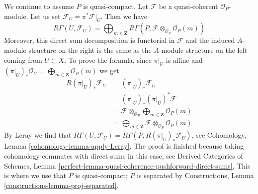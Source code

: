 \medskip\noindent
We continue to assume $P$ is quasi-compact.
Let $\mathcal{F}$ be a quasi-coherent $\mathcal{O}_P$-module.
Let us set $\mathcal{F}_U = \pi^*\mathcal{F}|_U$. Then we have
\begin{equation}
\label{equation-cohomology-torsor}
R\Gamma(U, \mathcal{F}_U) =
\bigoplus\nolimits_{m \in \mathbf{Z}}
R\Gamma(P, \mathcal{F} \otimes_{\mathcal{O}_P} \mathcal{O}_P(m))
\end{equation}
Moreover, this direct sum decomposition is functorial in $\mathcal{F}$
and the induced $A$-module structure on the right is the same as the
$A$-module structure on the left coming from $U \subset X$.
To prove the formula, since $\pi|_U$ is affine and
$(\pi|_U)_*\mathcal{O}_U = \bigoplus_{m \in \mathbf{Z}} \mathcal{O}_P(m)$
we get
\begin{align*}
R(\pi|_U)_*\mathcal{F}_U
& =
(\pi|_U)_*\mathcal{F}_U \\
& =
(\pi|_U)_*(\pi|_U)^*\mathcal{F} \\
& =
\mathcal{F} \otimes_{\mathcal{O}_P} 
\bigoplus\nolimits_{m \in \mathbf{Z}} \mathcal{O}_P(m) \\
& =
\bigoplus\nolimits_{m \in \mathbf{Z}}
\mathcal{F} \otimes_{\mathcal{O}_P} \mathcal{O}_P(m)
\end{align*}
By Leray we find that
$R\Gamma(U, \mathcal{F}_U) =
R\Gamma(P, R(\pi|_U)_*\mathcal{F}_U)$, see
Cohomology, Lemma \ref{cohomology-lemma-apply-Leray}.
The proof is finished because taking cohomology commutes with
direct sums in this case, see Derived Categories of Schemes, Lemma
\ref{perfect-lemma-quasi-coherence-pushforward-direct-sums}.
This is where we use that $P$ is quasi-compact; $P$ is separated
by Constructions, Lemma \ref{constructions-lemma-proj-separated}.